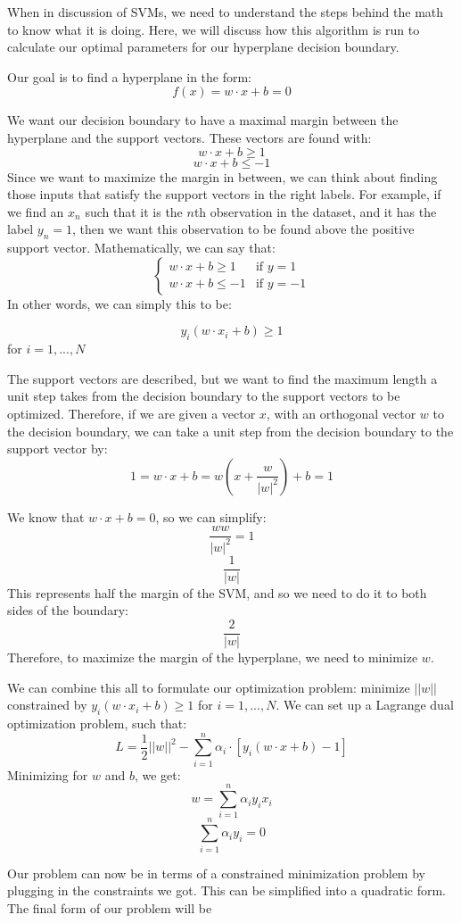 \documentclass[12pt]{article}
\begin{document}
When in discussion of SVMs, we need to understand the steps behind the math to know what it is doing. Here, we will discuss how this algorithm is run to calculate our optimal parameters for our hyperplane decision boundary.

Our goal is to find a hyperplane in the form:
$$f(x) = w \cdot x + b = 0$$

We want our decision boundary to have a maximal margin between the hyperplane and the support vectors. These vectors are found with:
$$w \cdot x + b \geq 1$$
$$w \cdot x + b  \leq -1$$
Since we want to maximize the margin in between, we can think about finding those inputs that satisfy the support vectors in the right labels. For example, if we find an $x_n$ such that it is the $n$th observation in the dataset, and it has the label $y_n = 1$, then we want this observation to be found above the positive support vector. Mathematically, we can say that:
$$\begin{cases}
      w \cdot x + b \geq 1 & \text{if } y = 1 \\
      w \cdot x + b \leq -1 & \text{if } y = -1
\end{cases}$$
In other words, we can simply this to be:

$$y_i (w \cdot x_i + b) \geq 1$$ for $i = 1,...,N$

The support vectors are described, but we want to find the maximum length a unit step takes from the decision boundary to the support vectors to be optimized. Therefore, if we are given a vector $x$, with an orthogonal vector $w$ to the decision boundary, we can take a unit step from the decision boundary to the support vector by:
$$1 = w \cdot x + b = w(x + \frac{w}{|w|^2}) + b = 1$$

We know that $w \cdot x + b = 0$, so we can simplify:
$$\frac{ww}{|w|^2} = 1$$
$$\frac{1}{|w|}$$
This represents half the margin of the SVM, and so we need to do it to both sides of the boundary:
$$\frac{2}{|w|}$$
Therefore, to maximize the margin of the hyperplane, we need to minimize $w$.

We can combine this all to formulate our optimization problem: minimize $||w||$ constrained by $y_i (w \cdot x_i + b) \geq 1$ for $i = 1,...,N$.
We can set up a Lagrange dual optimization problem, such that:
$$L = \frac{1}{2}||w||^2 - \sum_{i=1}^{n} \alpha_i \cdot [y_i(w \cdot x + b) - 1]$$
Minimizing for $w$ and $b$, we get:
$$w = \sum_{i=1}^{n} \alpha_i y_i x_i$$
$$\sum_{i=1}^{n} \alpha_i y_i = 0$$

Our problem can now be in terms of a constrained minimization problem by plugging in the constraints we got. This can be simplified into a quadratic form. The final form of our problem will be
\end{document}
